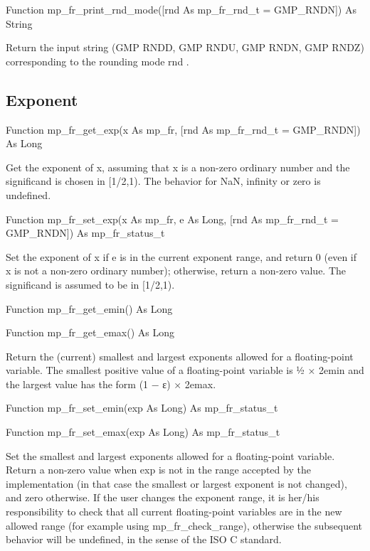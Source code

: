 \vspace{0.3cm}
Function mp\_fr\_print\_rnd\_mode([rnd As mp\_fr\_rnd\_t = GMP\_RNDN]) As String 

Return the input string (GMP RNDD, GMP RNDU, GMP RNDN, GMP RNDZ) corresponding to the rounding mode rnd . 




\subsection{Exponent}


\vspace{0.3cm}Function mp\_fr\_get\_exp(x As mp\_fr, [rnd As mp\_fr\_rnd\_t = GMP\_RNDN]) As Long 

Get the exponent of x, assuming that x is a non-zero ordinary number and the significand is chosen in [1/2,1). The behavior for NaN, infinity or zero is undefined. 

\vspace{0.3cm}
Function mp\_fr\_set\_exp(x As mp\_fr, e As Long, [rnd As mp\_fr\_rnd\_t = GMP\_RNDN]) As mp\_fr\_status\_t 

Set the exponent of x if e is in the current exponent range, and return 0 (even if x is not a non-zero ordinary number); otherwise, return a non-zero value. The significand is assumed to be in [1/2,1). 

\vspace{0.3cm}
Function mp\_fr\_get\_emin() As Long 

Function mp\_fr\_get\_emax() As Long 

Return the (current) smallest and largest exponents allowed for a floating-point variable. The smallest positive value of a floating-point variable is ½ × 2emin and the largest value has the form (1 − ε) × 2emax. 

\vspace{0.3cm}
Function mp\_fr\_set\_emin(exp As Long) As mp\_fr\_status\_t 

Function mp\_fr\_set\_emax(exp As Long) As mp\_fr\_status\_t 

Set the smallest and largest exponents allowed for a floating-point variable. Return a non-zero value when exp is not in the range accepted by the implementation (in that case the smallest or largest exponent is not changed), and zero otherwise. If the user changes the exponent range, it is her/his responsibility to check that all current floating-point variables are in the new allowed range (for example using mp\_fr\_check\_range), otherwise the subsequent behavior will be undefined, in the sense of the ISO C standard. 

